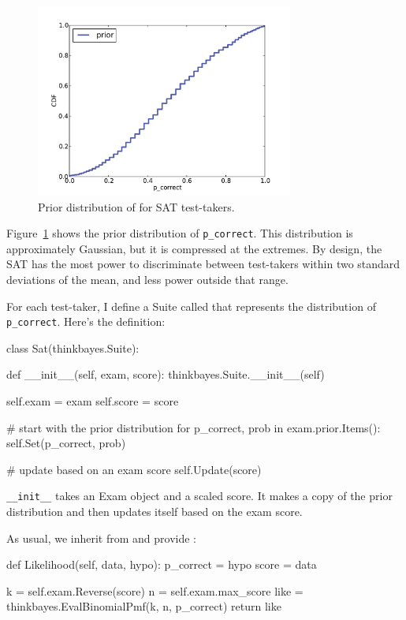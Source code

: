 \documentclass[12pt]{book}
\theoremstyle{exercise}
\begin{document}
\begin{figure}
\centerline{\includegraphics[height=2.5in]{figs/sat_prior.pdf}}
\caption{Prior distribution of  for SAT test-takers.}
\label{fig.satprior}
\end{figure}

Figure~\ref{fig.satprior} shows the prior distribution of
\verb"p_correct".  This distribution is approximately Gaussian, but it
is compressed at the extremes.  By design, the SAT has the most power
to discriminate between test-takers within two standard deviations of
the mean, and less power outside that range.

For each test-taker, I define a Suite called  that
represents the distribution of \verb"p_correct".  Here's the definition:

\begin{code}
class Sat(thinkbayes.Suite):

    def __init__(self, exam, score):
        thinkbayes.Suite.__init__(self)

        self.exam = exam
        self.score = score

        # start with the prior distribution
        for p_correct, prob in exam.prior.Items():
            self.Set(p_correct, prob)

        # update based on an exam score
        self.Update(score)
\end{code}

\verb"__init__" takes an Exam object and a scaled score.  It makes a
copy of the prior distribution and then updates itself based on the
exam score.

As usual, we inherit  from  and provide
:

\begin{code}
    def Likelihood(self, data, hypo):
        p_correct = hypo
        score = data

        k = self.exam.Reverse(score)
        n = self.exam.max_score
        like = thinkbayes.EvalBinomialPmf(k, n, p_correct)
        return like
\end{code}
\end{document}
